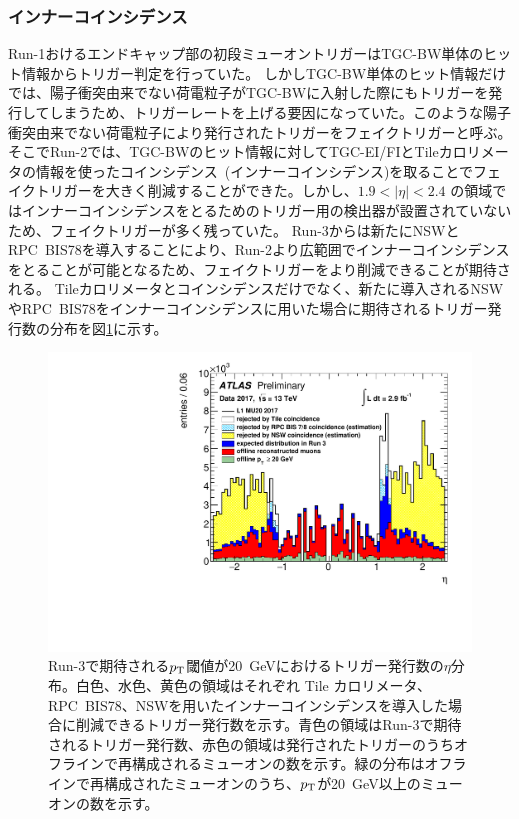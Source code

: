 \subsubsection{インナーコインシデンス}\label{innnercoin}
Run-1おけるエンドキャップ部の初段ミューオントリガーはTGC-BW単体のヒット情報からトリガー判定を行っていた。
しかしTGC-BW単体のヒット情報だけでは、陽子衝突由来でない荷電粒子がTGC-BWに入射した際にもトリガーを発行してしまうため、トリガーレートを上げる要因になっていた。このような陽子衝突由来でない荷電粒子により発行されたトリガーをフェイクトリガーと呼ぶ。そこでRun-2では、TGC-BWのヒット情報に対してTGC-EI/FIとTileカロリメータの情報を使ったコインシデンス~(インナーコインシデンス)を取ることでフェイクトリガーを大きく削減することができた。しかし、$1.9 < |\eta| < 2.4$ の領域ではインナーコインシデンスをとるためのトリガー用の検出器が設置されていないため、フェイクトリガーが多く残っていた。
Run-3からは新たにNSWとRPC~BIS78を導入することにより、Run-2より広範囲でインナーコインシデンスをとることが可能となるため、フェイクトリガーをより削減できることが期待される。
Tileカロリメータとコインシデンスだけでなく、新たに導入されるNSWやRPC~BIS78をインナーコインシデンスに用いた場合に期待されるトリガー発行数の分布を図\ref{fig:Rate_innercoincidence}に示す。

\begin{figure}[tb]
  \centering
    \includegraphics[clip, width=14cm]{fig/3/ATL-COM-DAQ-2018-033-fig2.pdf}
  \caption{Run-3で期待される$p_{\rm{T}}$閾値が20~GeVにおけるトリガー発行数の$\eta$分布\cite{article:ATLASpublic}。白色、水色、黄色の領域はそれぞれ Tile カロリメータ、RPC~BIS78、NSWを用いたインナーコインシデンスを導入した場合に削減できるトリガー発行数を示す。青色の領域はRun-3で期待されるトリガー発行数、赤色の領域は発行されたトリガーのうちオフラインで再構成されるミューオンの数を示す。緑の分布はオフラインで再構成されたミューオンのうち、$p_{\rm{T}}$が20~GeV以上のミューオンの数を示す。}
  \label{fig:Rate_innercoincidence}
\end{figure}


